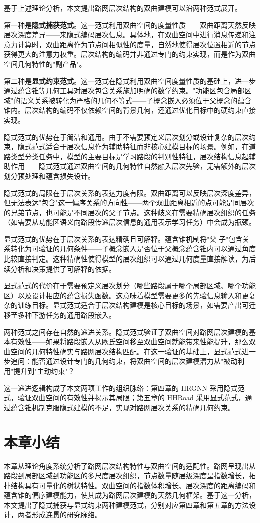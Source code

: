 基于上述理论分析，本文提出路网层次结构的双曲建模可以沿两种范式展开。

第一种是\textbf{隐式捕获范式}。这一范式利用双曲空间的度量性质——双曲距离天然反映层次深度差异——来隐式编码层次信息。具体地，在双曲空间中进行消息传递和注意力计算时，双曲距离作为节点间相似性的度量，自然地使得层次位置相近的节点获得更大的注意力权重。层次结构的编码并非通过专门的约束实现，而是作为双曲空间几何特性的"副产品"。

第二种是\textbf{显式约束范式}。这一范式在隐式利用双曲空间度量性质的基础上，进一步通过蕴含锥等几何工具对层次包含关系施加明确的数学约束。"功能区包含局部区域"的语义关系被转化为严格的几何不等式——子概念嵌入必须位于父概念的蕴含锥内。层次结构的编码不仅依赖空间的背景几何，还通过优化目标中的硬约束直接实现。

隐式范式的优势在于简洁和通用。由于不需要预定义层次划分或设计复杂的层次约束，隐式范式适合于层次信息作为辅助特征而非核心建模目标的场景。例如，在道路类型分类任务中，模型的主要目标是学习路段的判别性特征，层次结构信息起辅助作用——隐式范式通过双曲空间的几何特性自然融入层次先验，无需额外的层次划分预处理和蕴含损失设计。

隐式范式的局限在于层次关系的表达力度有限。双曲距离可以反映层次深度差异，但无法表达"包含"这一偏序关系的方向性——两个双曲距离相近的点可能是同层次的兄弟节点，也可能是不同层次的父子节点。这种歧义在需要精确层次组织的任务（如需要从功能区语义向路段传递层次信息的通用表示学习任务）中会成为瓶颈。

显式范式的优势在于层次关系的表达精确且可解释。蕴含锥机制将"父-子"包含关系转化为可验证的几何条件——子概念嵌入是否位于父概念蕴含锥内可以通过角度比较直接判定。这种精确性使得模型的层次组织可以通过几何度量直接解读，为后续分析和决策提供了可解释的依据。

显式范式的代价在于需要预定义层次划分（哪些路段属于哪个局部区域、哪个功能区）以及设计相应的蕴含损失函数。这意味着模型需要更多的先验信息输入和更复杂的训练目标。显式范式适合于层次结构建模是核心目标的场景，如需要产出可迁移至多种下游任务的通用路段嵌入。

两种范式之间存在自然的递进关系。隐式范式验证了双曲空间对路网层次建模的基本有效性——如果将路段嵌入从欧氏空间移至双曲空间就能带来性能提升，那么双曲空间的几何特性确实与路网层次结构匹配。在这一验证的基础上，显式范式进一步追问：能否通过设计专门的几何约束，将双曲空间的层次建模潜力从"被动利用"提升到"主动约束"？

这一递进逻辑构成了本文两项工作的组织脉络：第四章的 HRGNN 采用隐式范式，验证双曲空间的有效性并揭示其局限；第五章的 HHRoad 采用显式范式，通过蕴含锥机制克服隐式建模的不足，实现对路网层次关系的精确几何约束。

\section{本章小结}

本章从理论角度系统分析了路网层次结构特性与双曲空间的适配性。路网呈现出从路段到局部区域到功能区的多尺度层次组织，节点数量随层级深度呈指数增长，拓扑结构具有可量化的树状特性。双曲空间的指数体积增长、层次深度的距离编码和蕴含锥的偏序建模能力，使其成为路网层次建模的天然几何框架。基于这一分析，本文提出了隐式捕获与显式约束两种建模范式，分别对应第四章和第五章的方法设计，两者形成连贯的研究脉络。
